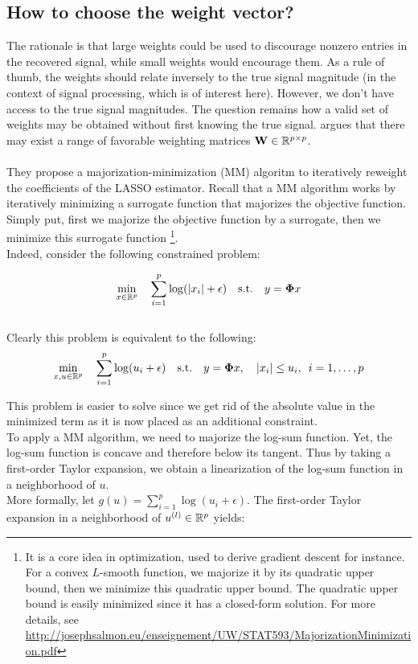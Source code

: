\documentclass[a4paper,10pt]{article}
\theoremstyle{definition}
\begin{document}
\subsection*{How to choose the weight vector?}

The rationale is that large weights could be used to discourage nonzero entries in the recovered signal, while small weights would encourage them. As a rule of thumb, the weights should relate inversely
to the true signal magnitude (in the context of signal processing, which is of interest here). However, we don't have access to the true signal magnitudes. The question remains how a valid set of weights
may be obtained without first knowing the true signal. \cite{Candes_Wakin_Boyd08} argues that there may exist a range of favorable weighting matrices $\mathbf{W} \in \mathbb{R}^{p \times p}$.
\\
\\
They propose a majorization-minimization (MM) algoritm to iteratively reweight the coefficients of the LASSO estimator.
Recall that a MM algorithm works by iteratively minimizing a surrogate function that majorizes the objective function.
Simply put, first we majorize the objective function by a surrogate, then we minimize this surrogate function \footnote{It is a core idea in optimization, used to derive gradient descent for instance.
For a convex $L$-smooth function, we majorize it by its quadratic upper bound, then we minimize this quadratic upper bound.
The quadratic upper bound is easily minimized since it has a closed-form solution.
For more details, see \url{http://josephsalmon.eu/enseignement/UW/STAT593/MajorizationMinimization.pdf}}.
\\
Indeed, consider the following constrained problem:

\begin{equation*}
    \min_{x \in \mathbb{R}^p} \quad  \sum_{i=1}^p \log(\lvert x_i \rvert + \epsilon) \quad \textrm{s.t.} \quad  y = \mathbf{\Phi} x
\end{equation*}
\\

Clearly this problem is equivalent to the following:
\begin{equation*}
    \min_{x,u \in \mathbb{R}^p} \quad  \sum_{i=1}^p \log(u_i + \epsilon) \quad \textrm{s.t.} \quad  y = \mathbf{\Phi} x, \quad \lvert x_i \rvert \leq u_i, \enspace i=1,\dots,p
\end{equation*}

This problem is easier to solve since we get rid of the absolute value in the minimized term as it is now placed as an additional constraint.
\\
To apply a MM algorithm, we need to majorize the log-sum function. Yet, the log-sum function is concave and therefore below its tangent. Thus by taking a first-order Taylor expansion, we obtain a linearization of
the log-sum function in a neighborhood of $u$.
\\
More formally, let $g(u) = \sum_{i=1}^p \log(u_i + \epsilon)$. The first-order Taylor expansion in a neighborhood of $u^{(l)} \in \mathbb{R}^p$ yields:
\end{document}
